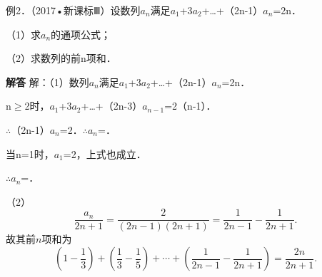 例2．（2017•新课标Ⅲ）设数列{\ensuremath{a_{n}}}满足\ensuremath{a_{1}}+3\ensuremath{a_{2}}+\ldots{}+（2n-1）\ensuremath{a_{n}}=2n．\par
（1）求{\ensuremath{a_{n}}}的通项公式；\par
（2）求数列{}的前n项和．\par
\QuestionSpace{4.8cm}
\ifshowanswers
\par\begingroup\color{solutioncolor}\noindent\textbf{解答}\quad
解：（1）数列{\ensuremath{a_{n}}}满足\ensuremath{a_{1}}+3\ensuremath{a_{2}}+\ldots{}+（2n-1）\ensuremath{a_{n}}=2n．\par
n\ensuremath{\ge}2时，\ensuremath{a_{1}}+3\ensuremath{a_{2}}+\ldots{}+（2n-3）\ensuremath{a_{n-1}}=2（n-1）．\par
\ensuremath{\therefore}（2n-1）\ensuremath{a_{n}}=2．\ensuremath{\therefore}\ensuremath{a_{n}}=．\par
当n=1时，\ensuremath{a_{1}}=2，上式也成立．\par
\ensuremath{\therefore}\ensuremath{a_{n}}=．\par
（2）
\[
\frac{a_n}{2n+1}
=\frac{2}{(2n-1)(2n+1)}
=\frac1{2n-1}-\frac1{2n+1}.
\]
故其前$n$项和为
\[
\left(1-\frac13\right)+\left(\frac13-\frac15\right)+\cdots+
\left(\frac1{2n-1}-\frac1{2n+1}\right)
=\boxed{\frac{2n}{2n+1}}.
\]
\par\endgroup\fi

